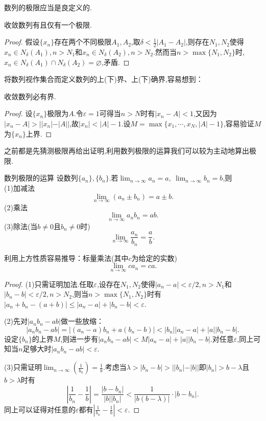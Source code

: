 数列的极限应当是良定义的.

\begin{proposition}{}
	收敛数列有且仅有一个极限.
\end{proposition}
\begin{proof}
	假设$\{ x_n \}$存在两个不同极限$A_1,A_2$,取$\delta < \frac{1}{2}|A_1-A_2|$,则存在$N_1,N_2$使得$x_n \in N_{\delta}(A_1),n > N_1$和$x_n \in N_{\delta}(A_2),n > N_2$.然而当$n>\max \{ N_1,N_2 \}$时,$x_n \in N_{\delta}(A_1) \cap N_{\delta}(A_2) = \varnothing$,矛盾.
\end{proof}

将数列视作集合而定义数列的上(下)界、上(下)确界,容易想到：

\begin{proposition}{}
	收敛数列必有界.
\end{proposition}
\begin{proof}
	设$\{ x_n \}$极限为$A$.令$\varepsilon = 1$可得当$n>N$时有$|x_n-A|<1$,又因为$|x_n-A|>||x_n|-|A||$,故$|x_n|<|A|-1$.设$M=\max \{ x_1, \cdots ,x_N,|A|-1 \}$,容易验证$M$为$\{ x_n \}$上界.
\end{proof}

之前都是先猜测极限再给出证明,利用数列极限的运算我们可以较为主动地算出极限.

\begin{theorem}{数列极限的运算}
	设数列$\{ a_n \},\{ b_n \}$.若$\lim_{n \to \infty} a_n=a,~\lim_{n \to \infty} b_n=b$,则 \\
	(1)加减法$$\lim_{n \to \infty}{(a_n \pm b_n)} = a \pm b.$$
	(2)乘法$$\lim_{n \to \infty}{a_nb_n} = ab.$$
	(3)除法(当$b \neq 0$且$b_n \neq 0$时)$$\lim_{n \to \infty}{\frac{a_n}{b_n}} = \frac{a}{b}.$$
\end{theorem}
\begin{remark}
	利用上方性质容易推导：标量乘法(其中$c$为给定的实数)$$\lim_{n \to \infty}{ca_n}=ca.$$
	
\end{remark}
\begin{proof}
	(1)只需证明加法.任取$\varepsilon$,设存在$N_1,N_2$使得$|a_n-a|<\varepsilon /2,n>N_1$和$|b_n-b|<\varepsilon /2,n>N_2$,则当$n>\max \{ N_1,N_2 \}$时有$|a_n+b_n-(a+b)| \leq |a_n-a|+|b_n-b| < \varepsilon$.
	
	(2)先对$|a_nb_n-ab|$做一些放缩：$$|a_nb_n-ab| = |(a_n-a)b_n + a(b_n-b)| < |b_n||a_n-a| + |a||b_n-b|.$$
	设定$\{ b_n \}$的上界$M$,则进一步有$|a_nb_n-ab|<M|a_n-a| + |a||b_n-b|$.对任意$\varepsilon$,同上可知当$n$足够大时$|a_nb_n-ab|<\varepsilon$.
	
	(3)只需证明$\lim_{n\to \infty}(\frac{1}{b_n})=\frac{1}{b}$.考虑当$\lambda > |b_n-b| > ||b_n|-|b||$即$|b_n|>b-\lambda$且$b>\lambda$时有$$\left| \frac{1}{b_n} - \frac{1}{b} \right| = \frac{|b-b_n|}{|b||b_n|} < \frac{1}{|b(b-\lambda)|} \cdot |b-b_n|.$$
	同上可以证得对任意的$\varepsilon$都有$|\frac{1}{b_n}-\frac{1}{b} |<\varepsilon$.
\end{proof}

